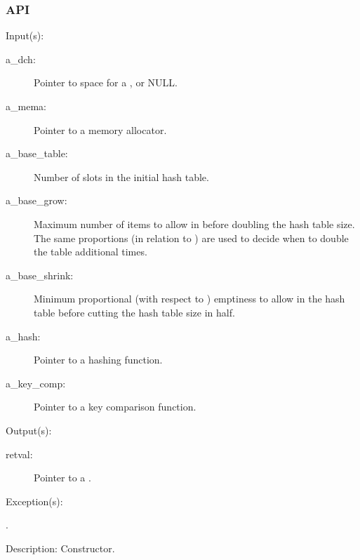 \subsubsection{API}
\begin{capi}

\label{dch_new}
	\begin{capilist}
	\item[Input(s): ]
		\begin{description}\item[]
		\item[a\_dch: ]
			Pointer to space for a , or NULL.
		\item[a\_mema: ]
			Pointer to a memory allocator.
		\item[a\_base\_table: ]
			Number of slots in the initial hash table.
		\item[a\_base\_grow: ]
			Maximum number of items to allow in  before
			doubling the hash table size.  The same proportions (in
			relation to ) are used to decide
			when to double the table additional times.
		\item[a\_base\_shrink: ]
			Minimum proportional (with respect to
			) emptiness to allow in the hash
			table before cutting the hash table size in half.
		\item[a\_hash: ]
			Pointer to a hashing function.
		\item[a\_key\_comp: ]
			Pointer to a key comparison function.
		\end{description}
	\item[Output(s): ]
		\begin{description}\item[]
		\item[retval: ]
			Pointer to a .
		\end{description}
	\item[Exception(s): ]
		\begin{description}\item[]
		\item[.]
		\end{description}
	\item[Description: ]
		Constructor.
	\end{capilist}

\end{capi}
